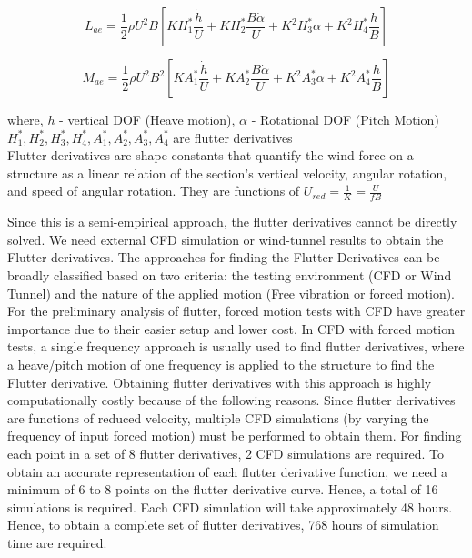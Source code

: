 \documentclass[a4paper, 12pt]{report}
\begin{document}
\begin{equation}
L_{ae} = \frac{1}{2}\rho U^2 B \left[ KH_1^* \frac{\dot{h}}{U} + KH_2^* \frac{B\dot{\alpha}}{U} + K^2 H_3^* \alpha + K^2 H_4^* \frac{h}{B} \right]
\end{equation}

\begin{equation}
M_{ae} = \frac{1}{2}\rho U^2 B^2 \left[ KA_1^* \frac{\dot{h}}{U} + KA_2^* \frac{B\dot{\alpha}}{U} + K^2 A_3^* \alpha + K^2 A_4^* \frac{h}{B} \right]
\end{equation}

where, $h$ - vertical DOF (Heave motion), $\alpha$ - Rotational DOF (Pitch Motion)\\
\phantom{where,} $H_1^*, H_2^*, H_3^*, H_4^*, A_1^*, A_2^*, A_3^*, A_4^*$ are flutter derivatives\\

Flutter derivatives are shape constants that quantify the wind force on a structure as a linear relation 
of the section's vertical velocity, angular rotation, and speed of angular rotation. They are functions 
of $U_{red} = \frac{1}{K} = \frac{U}{fB}$ 

Since this is a semi-empirical approach, the flutter derivatives cannot be directly solved. We need 
external CFD simulation or wind-tunnel results to obtain the Flutter derivatives. The approaches 
for finding the Flutter Derivatives can be broadly classified based on two criteria: the testing 
environment (CFD or Wind Tunnel) and the nature of the applied motion (Free vibration or forced 
motion). For the preliminary analysis of flutter, forced motion tests with CFD have greater 
importance due to their easier setup and lower cost. In CFD with forced motion tests, a single 
frequency approach is usually used to find flutter derivatives, where a heave/pitch motion of one 
frequency is applied to the structure to find the Flutter derivative. Obtaining flutter derivatives with 
this approach is highly computationally costly because of the following reasons. Since flutter 
derivatives are functions of reduced velocity, multiple CFD simulations (by varying the frequency 
of input forced motion) must be performed to obtain them. For finding each point in a set of 8 
flutter derivatives, 2 CFD simulations are required. To obtain an accurate representation of each 
flutter derivative function, we need a minimum of 6 to 8 points on the flutter derivative curve. 
Hence, a total of 16 simulations is required. Each CFD simulation will take approximately 48 hours. 
Hence, to obtain a complete set of flutter derivatives, 768 hours of simulation time are required.  
\end{document}
